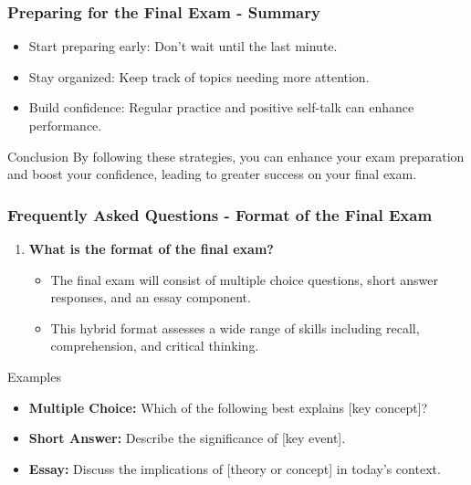 \documentclass[aspectratio=169]{beamer}
\begin{document}
\begin{frame}[fragile]
    \frametitle{Preparing for the Final Exam - Summary}
    \begin{itemize}
        \item Start preparing early: Don’t wait until the last minute.
        \item Stay organized: Keep track of topics needing more attention.
        \item Build confidence: Regular practice and positive self-talk can enhance performance.
    \end{itemize}
    \begin{block}{Conclusion}
        By following these strategies, you can enhance your exam preparation and boost your confidence, leading to greater success on your final exam.
    \end{block}
\end{frame}

\begin{frame}[fragile]
    \frametitle{Frequently Asked Questions - Format of the Final Exam}
    \begin{enumerate}
        \item \textbf{What is the format of the final exam?}
        \begin{itemize}
            \item The final exam will consist of multiple choice questions, short answer responses, and an essay component.
            \item This hybrid format assesses a wide range of skills including recall, comprehension, and critical thinking.
        \end{itemize}
    \end{enumerate}
    
    \begin{block}{Examples}
        \begin{itemize}
            \item \textbf{Multiple Choice:} Which of the following best explains [key concept]?
            \item \textbf{Short Answer:} Describe the significance of [key event].
            \item \textbf{Essay:} Discuss the implications of [theory or concept] in today's context.
        \end{itemize}
    \end{block}
\end{frame}
\end{document}
